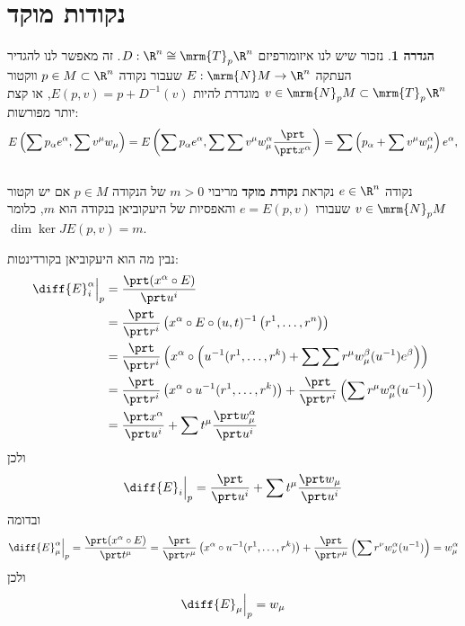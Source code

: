\documentclass{article}
\theoremstyle{definition}
\newtheorem*{definition*}{הגדרה}
\begin{document}
	\section{נקודות מוקד}

	\begin{definition*}
		נזכור שיש לנו איזומורפיזם
		\(D:\R^n \cong \mrm{T}_p \R^n\).
		זה מאפשר לנו להגדיר העתקה
		\(E:\mrm{N} M \to \R^n\)
		שעבור נקודה
		\(p \in M \subset \R^n\)
		ווקטור
		\(v \in \mrm{N}_p M \subset \mrm{T}_p \R^n\)
		מוגדרת להיות
		\(E(p,v)=p+D^{-1}(v)\),
		או קצת יותר מפורשות:
		\[
			E\left(\sum p_\alpha e^\alpha,\sum v^\mu w_\mu\right)
			= E\left(\sum p_\alpha e^\alpha,\sum \sum v^\mu w_\mu^\alpha \frac{\prt}{\prt x^\alpha}\right)
			= \sum \left(p_\alpha + \sum v^\mu w_\mu^\alpha\right) e^\alpha,
		\]
		\\
		נקודה
		\(e \in \R^n\)
		נקראת \textbf{נקודת מוקד} מריבוי
		\(m>0\)
		של הנקודה
		\(p \in M\)
		אם יש וקטור
		\(v \in \mrm{N}_p M\)
		שעבורו
		\(e = E(p,v)\)
		והאפסיות של היעקוביאן בנקודה הוא \(m\), כלומר
		\(\dim \ker JE(p,v) = m\).
	\end{definition*}

	נבין מה הוא היעקוביאן בקורדינטות:
	\begin{equation*}\begin{split}
		\diff{E}^\alpha_i\Big|_p
		&= \frac{\prt (x^\alpha \circ E)}{\prt u^i}
		\\&= \frac{\prt}{\prt r^i}\left (x^\alpha \circ E \circ (u,t)^{-1}\left(r^1,\dotsc,r^n\right)\right)
		\\&= \frac{\prt}{\prt r^i} \left(x^\alpha \circ \left(u^{-1}(r^1,\dotsc,r^k) + \sum\sum r^\mu w_\mu^\beta(u^{-1}) e^\beta \right)\right)
		\\&= \frac{\prt}{\prt r^i} \left(x^\alpha \circ u^{-1}(r^1,\dotsc,r^k)\right) + \frac{\prt}{\prt r^i} \left(\sum r^\mu w_\mu^\alpha(u^{-1}) \right)
		\\&= \frac{\prt x^\alpha}{\prt u^i} + \sum t^\mu \frac{\prt w_\mu^\alpha}{\prt u^i}
	\end{split}\end{equation*}
	ולכן
	\[
		\diff{E}_i\Big|_p = \frac{\prt}{\prt u^i} + \sum t^\mu \frac{\prt w_\mu}{\prt u^i}
	\]
	ובדומה
	\begin{equation*}
		\diff{E}^\alpha_\mu\Big|_p
		= \frac{\prt (x^\alpha \circ E)}{\prt t^\mu}
		= \frac{\prt}{\prt r^\mu} \left(x^\alpha \circ u^{-1}(r^1,\dotsc,r^k)\right) + \frac{\prt}{\prt r^\mu} \left(\sum r^\nu w_\nu^\alpha(u^{-1}) \right)
		= w_\mu^\alpha
	\end{equation*}
	ולכן
	\[
		\diff{E}_\mu\Big|_p = w_\mu
	\]
\end{document}
